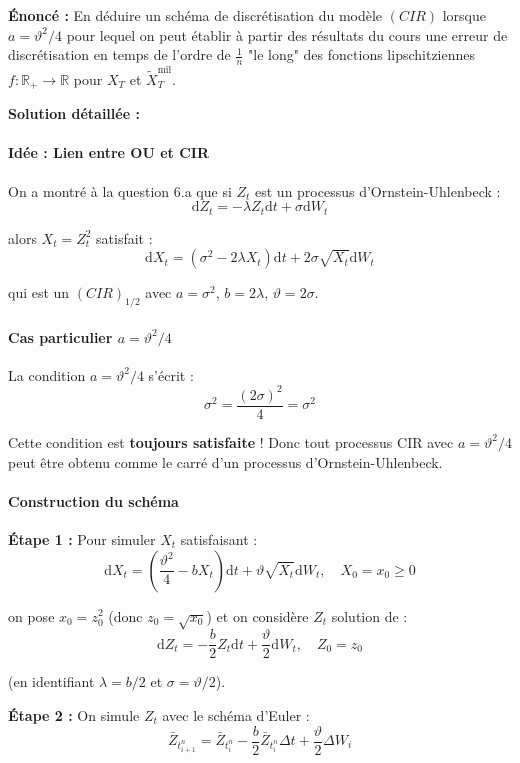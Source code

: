 \documentclass[12pt,a4paper]{article}
\theoremstyle{definition}
\theoremstyle{remark}
\newcommand{\R}{\mathbb{R}}
\newcommand{\dd}{\mathrm{d}}
\begin{document}
\textbf{Énoncé :} En déduire un schéma de discrétisation du modèle $(CIR)$ lorsque $a = \vartheta^2/4$ pour lequel on peut établir à partir des résultats du cours une erreur de discrétisation en temps de l'ordre de $\frac{1}{n}$ "le long" des fonctions lipschitziennes $f : \R_+ \to \R$ pour $X_T$ et $\tilde{X}_T^{\text{mil}}$.

\textbf{Solution détaillée :}

\paragraph{Idée : Lien entre OU et CIR}

On a montré à la question 6.a que si $Z_t$ est un processus d'Ornstein-Uhlenbeck :
\[
\dd Z_t = -\lambda Z_t \dd t + \sigma \dd W_t
\]

alors $X_t = Z_t^2$ satisfait :
\[
\dd X_t = (\sigma^2 - 2\lambda X_t)\dd t + 2\sigma \sqrt{X_t} \dd W_t
\]

qui est un $(CIR)_{1/2}$ avec $a = \sigma^2$, $b = 2\lambda$, $\vartheta = 2\sigma$.

\paragraph{Cas particulier $a = \vartheta^2/4$}

La condition $a = \vartheta^2/4$ s'écrit :
\[
\sigma^2 = \frac{(2\sigma)^2}{4} = \sigma^2
\]

Cette condition est \textbf{toujours satisfaite} ! Donc tout processus CIR avec $a = \vartheta^2/4$ peut être obtenu comme le carré d'un processus d'Ornstein-Uhlenbeck.

\paragraph{Construction du schéma}

\textbf{Étape 1 :} Pour simuler $X_t$ satisfaisant :
\[
\dd X_t = \left(\frac{\vartheta^2}{4} - bX_t\right)\dd t + \vartheta\sqrt{X_t}\dd W_t, \quad X_0 = x_0 \geq 0
\]

on pose $x_0 = z_0^2$ (donc $z_0 = \sqrt{x_0}$) et on considère $Z_t$ solution de :
\[
\dd Z_t = -\frac{b}{2}Z_t \dd t + \frac{\vartheta}{2}\dd W_t, \quad Z_0 = z_0
\]

(en identifiant $\lambda = b/2$ et $\sigma = \vartheta/2$).

\textbf{Étape 2 :} On simule $Z_t$ avec le schéma d'Euler :
\[
\bar{Z}_{t_{i+1}^n} = \bar{Z}_{t_i^n} - \frac{b}{2}\bar{Z}_{t_i^n}\Delta t + \frac{\vartheta}{2}\Delta W_i
\]
\end{document}
